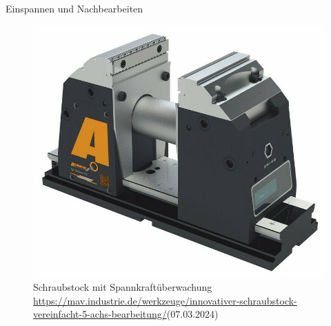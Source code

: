 \documentclass[../slides.tex]{subfiles}
\begin{document}
\begin{frame}{Einspannen und Nachbearbeiten}
  \begin{figure}[]
      \includegraphics[height=\textheight-70pt]{img_niklas/TeleSense_mit_Backen_final_93BB1CAF-5AC9-467B-ABD7-22EEFC24189A.jpg}
      \caption{Schraubstock mit Spannkraftüberwachung \\ \tiny{\url{https://mav.industrie.de/werkzeuge/innovativer-schraubstock-vereinfacht-5-achs-bearbeitung/}}(07.03.2024)}
      \label{fig:schraubstock}
    \end{figure}
    
\end{frame}
\end{document}
